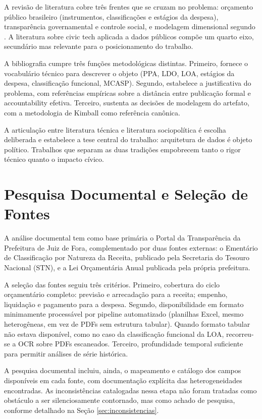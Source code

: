 A revisão de literatura cobre três frentes que se cruzam no problema:
orçamento público brasileiro (instrumentos, classificações e estágios
da despesa), transparência governamental e controle social, e
modelagem dimensional segundo .
A literatura sobre civic tech aplicada a dados públicos compõe um quarto
eixo, secundário mas relevante para o posicionamento do trabalho.

A bibliografia cumpre três funções metodológicas distintas. Primeiro,
fornece o vocabulário técnico para descrever o objeto (PPA, LDO, LOA,
estágios da despesa, classificação funcional, MCASP). Segundo,
estabelece a justificativa do problema, com referências empíricas
sobre a distância entre publicação formal e accountability efetiva.
Terceiro, sustenta as decisões de modelagem do artefato, com a
metodologia de Kimball como referência canônica.

A articulação entre literatura técnica e literatura sociopolítica é
escolha deliberada e estabelece a tese central do trabalho: arquitetura
de dados é objeto político. Trabalhos que separam as duas tradições
empobrecem tanto o rigor técnico quanto o impacto cívico.

\section{Pesquisa Documental e Seleção de Fontes}
\label{sec:documental}

A análise documental tem como base primária o Portal da Transparência
da Prefeitura de Juiz de Fora, complementado por duas fontes externas:
o Ementário de Classificação por Natureza da Receita, publicado pela
Secretaria do Tesouro Nacional (STN), e a Lei Orçamentária Anual
publicada pela própria prefeitura.

A seleção das fontes seguiu três critérios. Primeiro, cobertura do ciclo
orçamentário completo: previsão e arrecadação para a receita; empenho,
liquidação e pagamento para a despesa. Segundo, disponibilidade em
formato minimamente processável por pipeline automatizado (planilhas
Excel, mesmo heterogêneas, em vez de PDFs sem estrutura tabular). Quando
formato tabular não estava disponível, como no caso da classificação
funcional da LOA, recorreu-se a OCR sobre PDFs escaneados. Terceiro,
profundidade temporal suficiente para permitir análises de série
histórica.

A pesquisa documental incluiu, ainda, o mapeamento e catálogo dos campos
disponíveis em cada fonte, com documentação explícita das
heterogeneidades encontradas. As inconsistências catalogadas nessa
etapa não foram tratadas como obstáculo a ser silenciosamente
contornado, mas como achado de pesquisa, conforme detalhado na Seção
\ref{sec:inconsistencias}.

